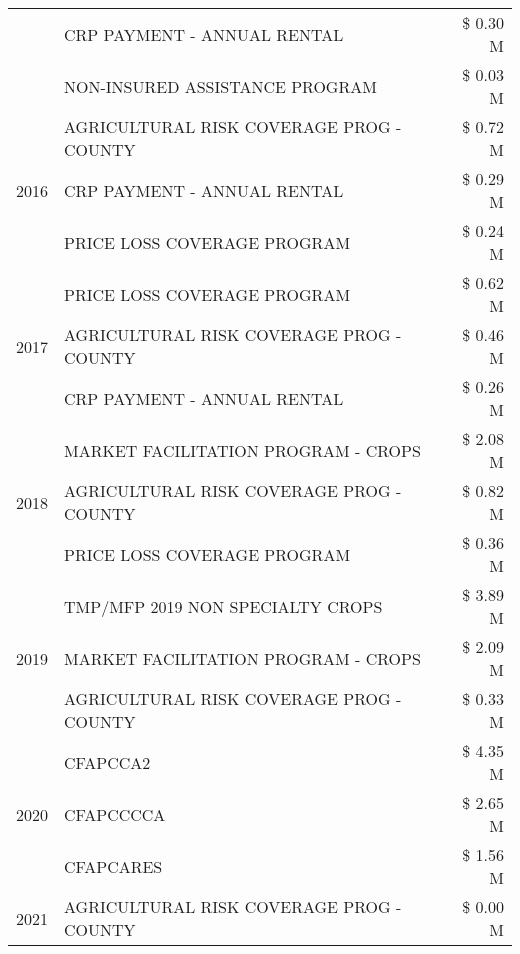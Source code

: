 \begin{tabular}{llr}
 & CRP PAYMENT - ANNUAL RENTAL & \$ 0.30 M \\
 & NON-INSURED ASSISTANCE PROGRAM & \$ 0.03 M \\
\cline{1-3}
\multirow[t]{3}{*}{2016} & AGRICULTURAL RISK COVERAGE PROG - COUNTY & \$ 0.72 M \\
 & CRP PAYMENT - ANNUAL RENTAL & \$ 0.29 M \\
 & PRICE LOSS COVERAGE PROGRAM & \$ 0.24 M \\
\cline{1-3}
\multirow[t]{3}{*}{2017} & PRICE LOSS COVERAGE PROGRAM & \$ 0.62 M \\
 & AGRICULTURAL RISK COVERAGE PROG - COUNTY & \$ 0.46 M \\
 & CRP PAYMENT - ANNUAL RENTAL & \$ 0.26 M \\
\cline{1-3}
\multirow[t]{3}{*}{2018} & MARKET FACILITATION PROGRAM - CROPS & \$ 2.08 M \\
 & AGRICULTURAL RISK COVERAGE PROG - COUNTY & \$ 0.82 M \\
 & PRICE LOSS COVERAGE PROGRAM & \$ 0.36 M \\
\cline{1-3}
\multirow[t]{3}{*}{2019} & TMP/MFP 2019 NON SPECIALTY CROPS & \$ 3.89 M \\
 & MARKET FACILITATION PROGRAM - CROPS & \$ 2.09 M \\
 & AGRICULTURAL RISK COVERAGE PROG - COUNTY & \$ 0.33 M \\
\cline{1-3}
\multirow[t]{3}{*}{2020} & CFAPCCA2 & \$ 4.35 M \\
 & CFAPCCCCA & \$ 2.65 M \\
 & CFAPCARES & \$ 1.56 M \\
\cline{1-3}
2021 & AGRICULTURAL RISK COVERAGE PROG - COUNTY & \$ 0.00 M \\
\cline{1-3}
\bottomrule
\end{tabular}
